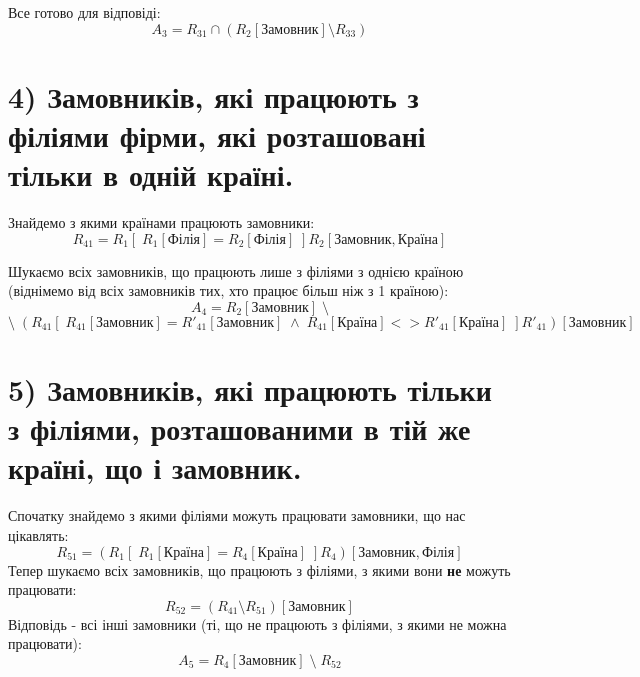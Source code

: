 \documentclass[11pt, a4paper]{article} %
\begin{document}
Все готово для відповіді:
$$A_3 = R_{31} \cap (R_2[\text{Замовник}] \setminus R_{33})$$

\section*{4) Замовників, які працюють з філіями фірми, які розташовані тільки в одній країні.}
Знайдемо з якими країнами працюють замовники:
$$R_{41} = R_1[\;R_1[\text{Філія}]=R_2[\text{Філія}]\;]R_2[\text{Замовник},\text{Країна}]$$

Шукаємо всіх замовників, що працюють лише з філіями з однією країною 
(віднімемо від всіх замовників тих, хто працює більш ніж з 1 країною):
$$A_4 = R_2[\text{Замовник}] \;\setminus $$
$$\setminus \;(R_{41}[\;R_{41}[\text{Замовник}]=R'_{41}[\text{Замовник}]\;\wedge\;
R_{41}[\text{Країна}] <> R'_{41}[\text{Країна}]\;]R'_{41})[\text{Замовник}]$$

\section*{5) Замовників, які працюють тільки з філіями, розташованими в тій же країні, що і замовник.}
Спочатку знайдемо з якими філіями можуть працювати замовники, що нас цікавлять:
$$R_{51} = (R_1[\;R_1[\text{Країна}]=R_4[\text{Країна}]\;]R_4)[\text{Замовник}, \text{Філія}]$$
Тепер шукаємо всіх замовників, що працюють з філіями, з якими вони \textbf{не} можуть працювати:
$$R_{52} = (R_{41}\setminus R_{51})[\text{Замовник}]$$
Відповідь - всі інші замовники (ті, що не працюють з філіями, з якими не можна працювати):
$$A_5 = R_4[\text{Замовник}] \;\setminus\; R_{52}$$
\end{document}
